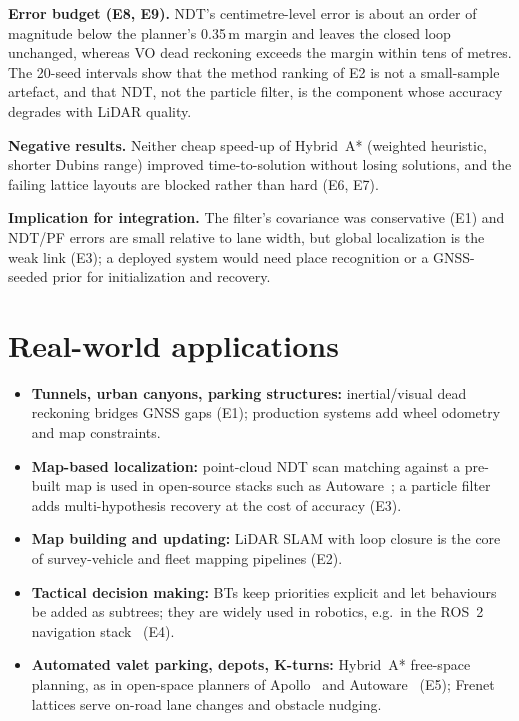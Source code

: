 \documentclass[11pt,a4paper]{article}
\begin{document}
\textbf{Error budget (E8, E9).} NDT's centimetre-level error is about an order of magnitude below the planner's 0.35\,m margin and leaves the closed loop unchanged, whereas VO dead reckoning exceeds the margin within tens of metres. The 20-seed intervals show that the method ranking of E2 is not a small-sample artefact, and that NDT, not the particle filter, is the component whose accuracy degrades with LiDAR quality.

\textbf{Negative results.} Neither cheap speed-up of Hybrid~A* (weighted heuristic, shorter Dubins range) improved time-to-solution without losing solutions, and the failing lattice layouts are blocked rather than hard (E6, E7).

\textbf{Implication for integration.} The filter's covariance was conservative (E1) and NDT/PF errors are small relative to lane width, but global localization is the weak link (E3); a deployed system would need place recognition or a GNSS-seeded prior for initialization and recovery.

\section{Real-world applications}
\begin{itemize}
\item \textbf{Tunnels, urban canyons, parking structures:} inertial/visual dead reckoning bridges GNSS gaps (E1); production systems add wheel odometry and map constraints.
\item \textbf{Map-based localization:} point-cloud NDT scan matching against a pre-built map is used in open-source stacks such as Autoware~\cite{kato18}; a particle filter adds multi-hypothesis recovery at the cost of accuracy (E3).
\item \textbf{Map building and updating:} LiDAR SLAM with loop closure is the core of survey-vehicle and fleet mapping pipelines (E2).
\item \textbf{Tactical decision making:} BTs keep priorities explicit and let behaviours be added as subtrees; they are widely used in robotics, e.g.\ in the ROS~2 navigation stack~\cite{macenski20} (E4).
\item \textbf{Automated valet parking, depots, K-turns:} Hybrid~A* free-space planning, as in open-space planners of Apollo~\cite{fan18} and Autoware~\cite{kato18} (E5); Frenet lattices serve on-road lane changes and obstacle nudging.
\end{itemize}
\end{document}

